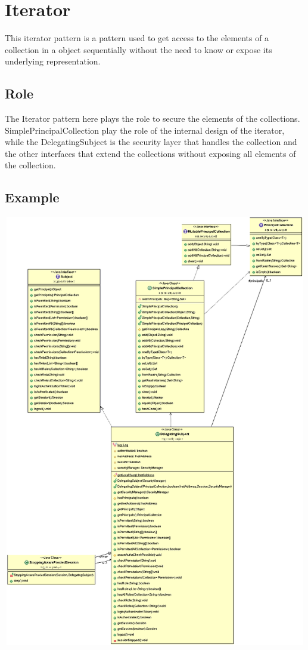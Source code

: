 \section{Iterator}

This iterator pattern is a pattern used to get access to the elements of a collection in a object sequentially without the need to know or expose its underlying representation.


\subsection*{Role}

The Iterator pattern here plays the role to secure the elements of the collections. SimplePrincipalCollection play the role of the internal design of the iterator, while the DelegatingSubject is the security layer that handles the collection and the other interfaces that extend the collections without exposing all elements of the collection.

\subsection*{Example}

\begin{center}
\includegraphics[width=16cm, height=19cm]{images/iterator.png}
\end{center}


